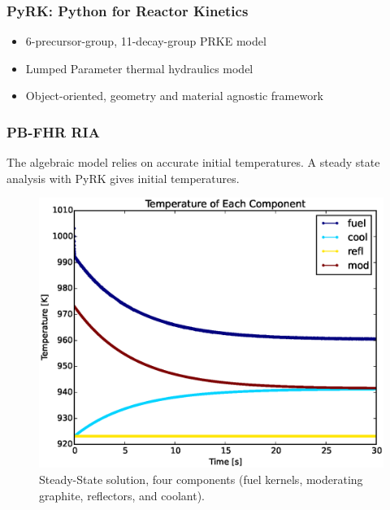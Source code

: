 
\begin{frame}[fragile]
  \frametitle{PyRK: Python for Reactor Kinetics}
  \begin{itemize}
    \item 6-precursor-group, 11-decay-group PRKE model
    \item Lumped Parameter thermal hydraulics model
    \item Object-oriented, geometry and material agnostic framework
  \end{itemize}
\end{frame}


\begin{frame}[fragile]
  \frametitle{PB-FHR RIA}
The algebraic model relies on accurate initial temperatures.
A steady state analysis with PyRK gives initial temperatures.
  \begin{figure}[htbp!]
    \begin{center}
      \includegraphics[height=0.7\textheight]{./progress/ss_w_o_feedbacks.eps}
    \end{center}
    \caption{Steady-State solution, four components (fuel kernels, moderating 
    graphite, reflectors, and coolant).}
    \label{fig:ss_w_o_feedbacks}
  \end{figure}
\end{frame}

